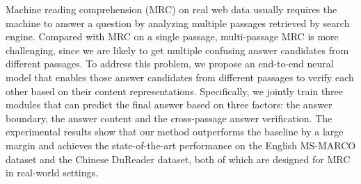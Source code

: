 Machine reading comprehension (MRC) on real web data usually requires the machine to answer a question by analyzing multiple passages retrieved by search engine. Compared with MRC on a single passage, multi-passage MRC is more challenging, since we are likely to get multiple confusing answer candidates from different passages. To address this problem, we propose an end-to-end neural model that enables those answer candidates from different passages to verify each other based on their content representations. Specifically, we jointly train three modules that can predict the final answer based on three factors: the answer boundary, the answer content and the cross-passage answer verification. The experimental results show that our method outperforms the baseline by a large margin and achieves the state-of-the-art performance on the English MS-MARCO dataset and the Chinese DuReader dataset, both of which are designed for MRC in real-world settings.
